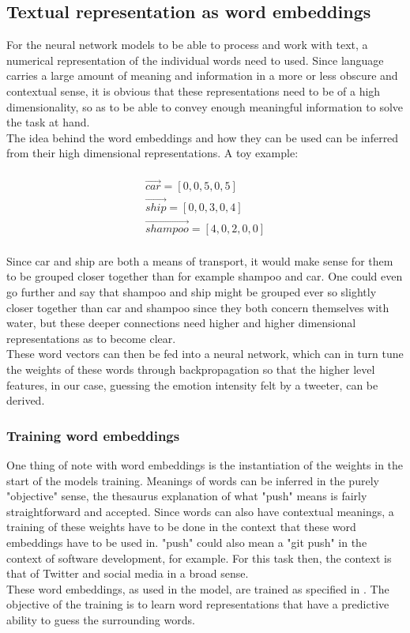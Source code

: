 \subsection{Textual representation as word embeddings}
For the neural network models to be able to process and work with text, a numerical representation of the individual words need to used. Since language carries a large amount of meaning and information in a more or less obscure and contextual sense, it is obvious that these representations need to be of a high dimensionality, so as to be able to convey enough meaningful information to solve the task at hand.\\
The idea behind the word embeddings and how they can be used can be inferred from their high dimensional representations. A toy example:\\
\\
\begin{align*}
\vec{car} = [0,0,5,0,5]\\
\vec{ship} = [0,0,3,0,4]\\
\vec{shampoo} = [4,0,2,0,0]
\end{align*}\\
Since car and ship are both a means of transport, it would make sense for them to be grouped closer together than for example shampoo and car. One could even go further and say that shampoo and ship might be grouped ever so slightly closer together than car and shampoo since they both concern themselves with water, but these deeper connections need higher and higher dimensional representations as to become clear.\\
These word vectors can then be fed into a neural network, which can in turn tune the weights of these words through backpropagation so that the higher level features, in our case, guessing the emotion intensity felt by a tweeter, can be derived.

\subsubsection{Training word embeddings}
One thing of note with word embeddings is the instantiation of the weights in the start of the models training. Meanings of words can be inferred in the purely "objective" sense, the thesaurus explanation of what "push" means is fairly straightforward and accepted. Since words can also have contextual meanings, a training of these weights have to be done in the context that these word embeddings have to be used in. "push" could also mean a "git push" in the context of software development, for example. For this task then, the context is that of Twitter and social media in a broad sense.\\
These word embeddings, as used in the model, are trained as specified in \cite{mikolov}. The objective of the training is to learn word representations that have a predictive ability to guess the surrounding words. 

